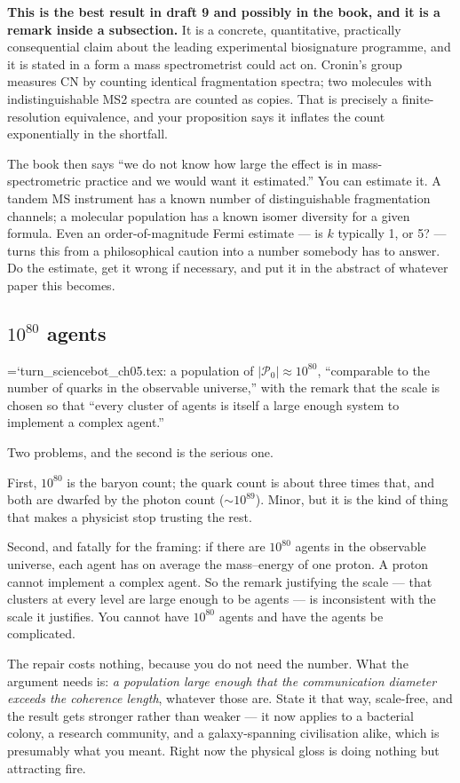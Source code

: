 \documentclass[11pt,letterpaper]{article}
\newcommand{\loc}[1]{{\small\ttfamily\color{accent}\hyphenchar\font=`\-\relax #1}}
\newcommand{\fnd}[1]{\textbf{\color{warn}#1}}
\newcommand{\CN}{\mathrm{CN}}
\begin{document}
\fnd{This is the best result in draft 9 and possibly in the book, and
it is a remark inside a subsection.} It is a concrete, quantitative,
practically consequential claim about the leading experimental
biosignature programme, and it is stated in a form a mass
spectrometrist could act on. Cronin's group measures $\CN$ by counting
identical fragmentation spectra; two molecules with indistinguishable
MS2 spectra are counted as copies. That is precisely a finite-resolution
equivalence, and your proposition says it inflates the count
exponentially in the shortfall.

The book then says ``we do not know how large the effect is in
mass-spectrometric practice and we would want it estimated.'' You can
estimate it. A tandem MS instrument has a known number of
distinguishable fragmentation channels; a molecular population has a
known isomer diversity for a given formula. Even an order-of-magnitude
Fermi estimate --- is $k$ typically 1, or 5? --- turns this from a
philosophical caution into a number somebody has to answer. Do the
estimate, get it wrong if necessary, and put it in the abstract of
whatever paper this becomes.

\subsection*{$10^{80}$ agents}

\loc{turn\_sciencebot\_ch05.tex}: a population of $|\mathcal{P}_0|
\approx 10^{80}$, ``comparable to the number of quarks in the
observable universe,'' with the remark that the scale is chosen so that
``every cluster of agents is itself a large enough system to implement
a complex agent.''

Two problems, and the second is the serious one.

First, $10^{80}$ is the baryon count; the quark count is about three
times that, and both are dwarfed by the photon count ($\sim 10^{89}$).
Minor, but it is the kind of thing that makes a physicist stop
trusting the rest.

Second, and fatally for the framing: if there are $10^{80}$ agents in
the observable universe, each agent has on average the mass--energy of
one proton. A proton cannot implement a complex agent. So the remark
justifying the scale --- that clusters at every level are large enough
to be agents --- is inconsistent with the scale it justifies. You
cannot have $10^{80}$ agents and have the agents be complicated.

The repair costs nothing, because you do not need the number. What the
argument needs is: \emph{a population large enough that the
communication diameter exceeds the coherence length}, whatever those
are. State it that way, scale-free, and the result gets stronger
rather than weaker --- it now applies to a bacterial colony, a research
community, and a galaxy-spanning civilisation alike, which is
presumably what you meant. Right now the physical gloss is doing
nothing but attracting fire.
\end{document}
